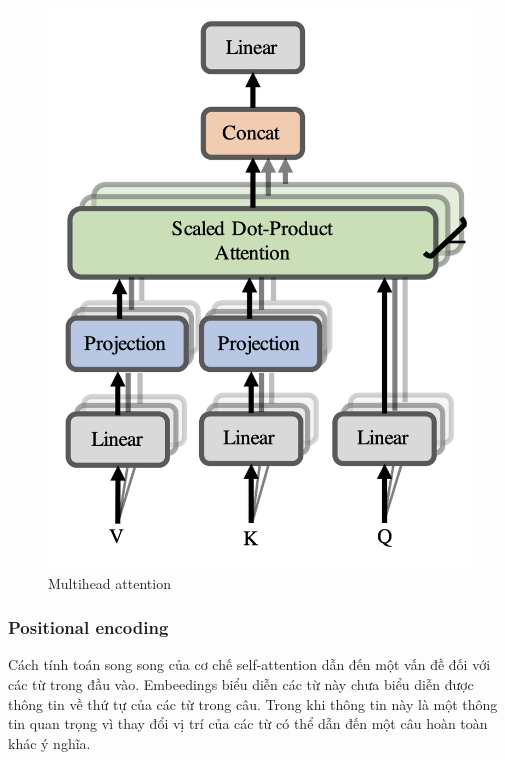 \begin{figure}[H]
    \begin{center}
        \includegraphics[scale=0.6]{images/multihead-attention}
        \caption{Multihead attention}
        \label{fig:multihead-attention}
    \end{center}
\end{figure}



\subsubsection{Positional encoding}

Cách tính toán song song của cơ chế self-attention dẫn đến một vấn đề đối với các từ trong đầu vào. Embeedings biểu diễn các từ này chưa biểu diễn được thông tin về thứ tự của các từ trong câu. Trong khi thông tin này là một thông tin quan trọng vì thay đổi vị trí của các từ có thể dẫn đến một câu hoàn toàn khác ý nghĩa.

